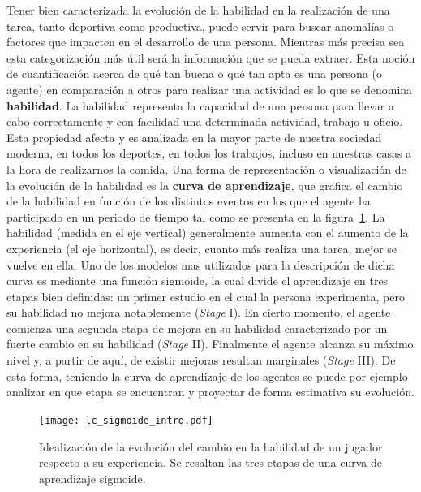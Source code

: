 \documentclass[11pt,twoside,spanish]{report} %
\begin{document}
Tener bien caracterizada la evoluci\'on de la habilidad en la realizaci\'on de una tarea, tanto deportiva como productiva, puede servir para buscar anomal\'ias o factores que impacten en el desarrollo de una persona.
Mientras m\'as precisa sea esta categorizaci\'on m\'as \'util ser\'a la informaci\'on que se pueda extraer.
Esta noci\'on de cuantificaci\'on acerca de qu\'e tan buena o qu\'e tan apta es una persona (o agente) en comparaci\'on a otros para realizar una actividad es lo que se denomina \textbf{habilidad}.
La habilidad representa la capacidad de una persona para llevar a cabo correctamente y con facilidad una determinada actividad, trabajo u oficio.
Esta propiedad afecta y es analizada en la mayor parte de nuestra sociedad moderna, en todos los deportes, en todos los trabajos, incluso en nuestras casas a la hora de realizarnos la comida.
Una forma de representaci\'on o visualizaci\'on de la evoluci\'on de la habilidad es la \textbf{curva de aprendizaje}, que grafica el cambio de la habilidad en funci\'on de los distintos eventos en los que el agente ha participado en un periodo de tiempo tal como se presenta en la figura~\ref{fig:lc_sigmoide_intro}.
La habilidad (medida en el eje vertical) generalmente aumenta con el aumento de la experiencia (el eje horizontal), es decir, cuanto m\'as realiza una tarea, mejor se vuelve en ella.
Uno de los modelos mas utilizados para la descripci\'on de dicha curva es mediante una funci\'on sigmoide, la cual divide el aprendizaje en tres etapas bien definidas: un primer estudio en el cual la persona experimenta, pero su habilidad no mejora notablemente (\textit{Stage} I).
En cierto momento, el agente comienza una segunda etapa de mejora en su habilidad caracterizado por un fuerte cambio en su habilidad (\textit{Stage} II).
Finalmente el agente alcanza su m\'aximo nivel y, a partir de aqu\'i, de existir mejoras resultan marginales (\textit{Stage} III).
De esta forma, teniendo la curva de aprendizaje de los agentes se puede por ejemplo analizar en que etapa se encuentran y proyectar de forma estimativa su evoluci\'on.
\begin{figure} %
	\texttt{[image: lc\_sigmoide\_intro.pdf]}
	\caption{Idealizaci\'on de la evoluci\'on del cambio en la habilidad de un jugador respecto a su experiencia. Se resaltan las tres etapas de una curva de aprendizaje sigmoide.}
	\label{fig:lc_sigmoide_intro}
\end{figure}
\end{document}

